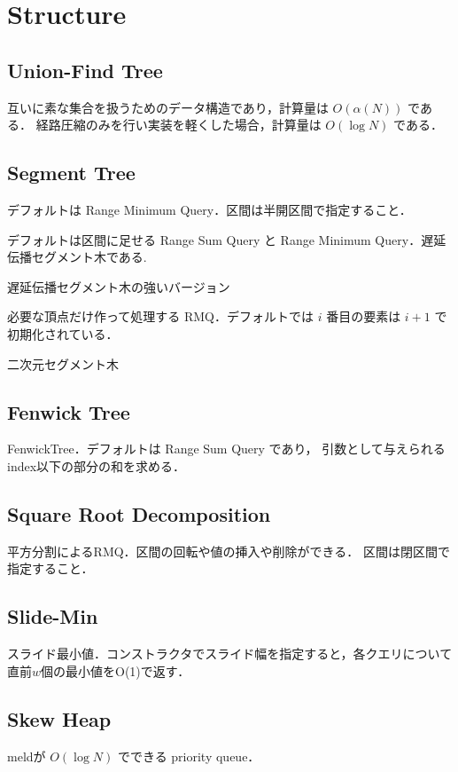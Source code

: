 \section{Structure}

\subsection{Union-Find Tree}
互いに素な集合を扱うためのデータ構造であり，計算量は $O(\alpha(N))$ である．
経路圧縮のみを行い実装を軽くした場合，計算量は $O(\log N)$ である．


\subsection{Segment Tree}
デフォルトは Range Minimum Query．区間は半開区間で指定すること．

デフォルトは区間に足せる Range Sum Query と Range Minimum Query．遅延伝播セグメント木である.

遅延伝播セグメント木の強いバージョン

必要な頂点だけ作って処理する RMQ．デフォルトでは $i$ 番目の要素は $i+1$ で初期化されている．

二次元セグメント木


\subsection{Fenwick Tree}
FenwickTree．デフォルトは Range Sum Query であり，
引数として与えられるindex以下の部分の和を求める．


\subsection{Square Root Decomposition}
平方分割によるRMQ．区間の回転や値の挿入や削除ができる．
区間は閉区間で指定すること．


\subsection{Slide-Min}
スライド最小値．コンストラクタでスライド幅を指定すると，各クエリについて直前$w$個の最小値をO(1)で返す．


\subsection{Skew Heap}
meldが $O(\log N)$ でできる priority queue．


